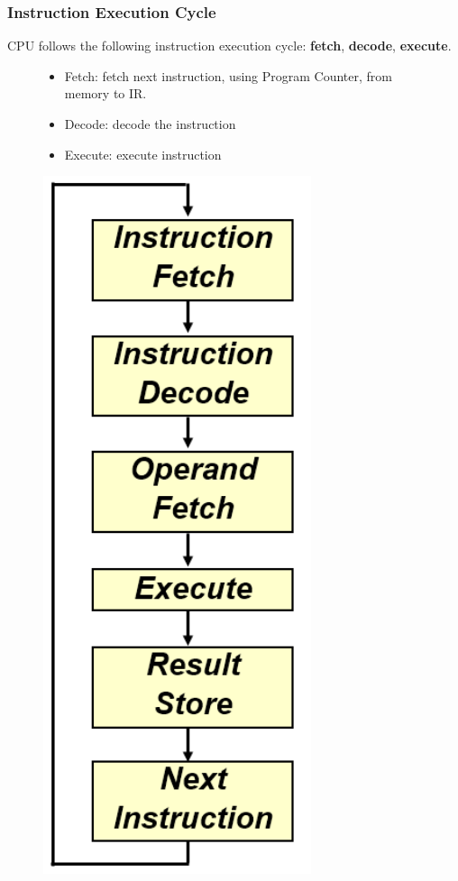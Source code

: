 \documentclass[12pt]{article}
\theoremstyle{definition}
\begin{document}
\subsubsection{Instruction Execution Cycle}
CPU follows the following instruction execution cycle: \textbf{fetch}, \textbf{decode}, \textbf{execute}.
\begin{figure}[h]
\begin{minipage}{0.75\textwidth}
\begin{itemize}
  \item Fetch: fetch next instruction, using Program Counter, from memory to IR.
  \item Decode: decode the instruction
  \item Execute: execute instruction
\end{itemize}\end{minipage}\hfill\begin{minipage}{0.24\textwidth}\includegraphics[width = 0.7\textwidth]{10_1.png}\end{minipage}
\end{figure}
\end{document}
